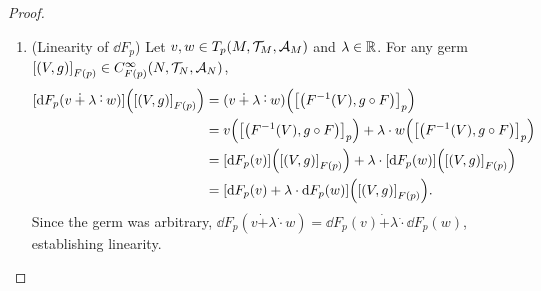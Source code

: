 \documentclass[11pt,reqno]{amsart}
\newcommand{\pwplus}{\mathbin{\dot{+}}}
\newcommand{\pwcdot}{\mathbin{\dot{\cdot}}}
\begin{document}
\begin{proof}
\begin{enumerate}
\begin{enumerate}
\item (Leibniz Rule of $\dd F_p(v)$)
Let $\SqBr{(V,g)}_{F(p)},\SqBr{(W,h)}_{F(p)}\in C_{F(p)}^\infty(N,\T_N,\A_N)$.
Then
\[\begin{aligned}
&\FUNC{\dd F_p(v)}{\SqBr{(V,g)}_{F(p)}\times\SqBr{(W,h)}_{F(p)}}\\
&=\FUNC{\dd F_p(v)}{\SqBr{\Br{V\cap W,g\cdot h}}_{F(p)}}\\
&=v\Br{\SqBr{\Br{F\inv(V\cap W),(g\cdot h)\circ F}}_p}\\
&=v\Br{\SqBr{\Br{F\inv(V)\cap F\inv(W),(g\circ F)\cdot(h\circ F)}}_p}\\
&=v\Br{\SqBr{\Br{F\inv(V),g\circ F}}_p
\times\SqBr{\Br{F\inv(W),h\circ F}}_p}\\
&=v\Br{\SqBr{\Br{F\inv(V),g\circ F}}_p}\cdot(h\circ F)(p)
+(g\circ F)(p)\cdot v\Br{\SqBr{\Br{F\inv(W),h\circ F}}_p}\\
&=\FUNC{\dd F_p(v)}{\SqBr{(V,g)}_{F(p)}}\cdot h(F(p))
+g(F(p))\cdot\FUNC{\dd F_p(v)}{\SqBr{(W,h)}_{F(p)}}.
\end{aligned}\]
\end{enumerate}
Thus $\dd F_p(v)\in T_{F(p)}(N,\T_N,\A_N)$, so the codomain is correct.

\item (Linearity of $\dd F_p$)
Let $v,w\in T_p(M,\mathcal{T}_M,\mathcal{A}_M)$ and $\lambda\in\mathbb{R}$.
For any germ $\SqBr{(V,g)}_{F(p)}\in C_{F(p)}^\infty(N,\T_N,\A_N)$,
\[\begin{aligned}
\FUNC{\dd F_p(v\pwplus\lambda\pwcdot w)}{\SqBr{(V,g)}_{F(p)}}
&=(v\pwplus\lambda\pwcdot w)
\Br{\SqBr{\Br{F\inv(V),g\circ F}}_p}\\
&=v\Br{\SqBr{\Br{F\inv(V),g\circ F}}_p}
+\lambda\cdot w\Br{\SqBr{\Br{F\inv(V),g\circ F}}_p}\\
&=\FUNC{\dd F_p(v)}{\SqBr{(V,g)}_{F(p)}}
+\lambda\cdot\FUNC{\dd F_p(w)}{\SqBr{(V,g)}_{F(p)}}\\
&=\FUNC{\dd F_p(v)+\lambda\cdot\dd F_p(w)}{\SqBr{(V,g)}_{F(p)}}.
\end{aligned}\]
Since the germ was arbitrary,
$\dd F_p(v\pwplus\lambda\pwcdot w)
=\dd F_p(v)\pwplus\lambda\pwcdot\dd F_p(w)$,
establishing linearity.
\end{enumerate}
\end{proof}
\end{document}
